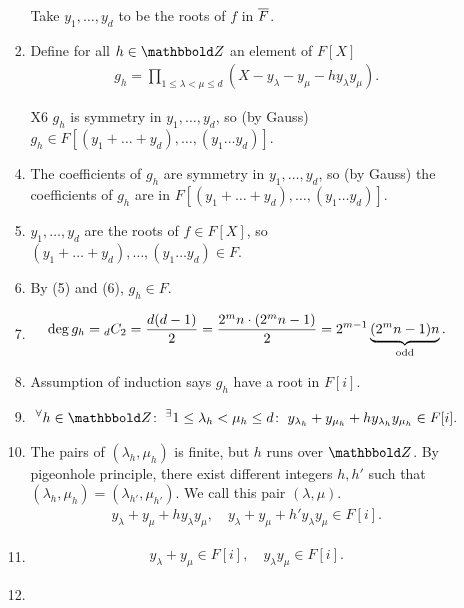 \documentclass[9pt]{ltjsarticle}
\begin{document}
\begin{itemize}
\begin{itemize}
\begin{enumerate}
      Take $y_1,\dots,y_d$ to be the roots of $f$ in $\overline{F}$.
      \item
      Define for all $h\in \Z$ an element of $F[X]$
      \begin{align}
        g_h = \prod_{1\le \lambda < \mu \le d} (X- y_\lambda - y_\mu -hy_\lambda y_\mu).
      \end{align}
      \item[X6]
      $g_h$ is symmetry in $y_1,\dots,y_d$, so (by Gauss)
      $g_h \in F[(y_1+\dots+y_d),\dots,(y_1\dots y_d)]$.
      \item
      The coefficients of $g_h$ are symmetry in $y_1,\dots,y_d$,
      so (by Gauss) the coefficients of $g_h$ are in $F[(y_1+\dots+y_d),\dots,(y_1\dots y_d)]$.

      \item
      $y_1,\dots,y_d$ are the roots of $f\in F[X]$, so
      $(y_1+\dots+y_d),\dots,(y_1\dots y_d) \in F$.
      \item
      By (5) and (6), $g_h \in F$.
      \item
      \begin{align}
        \deg g_h = {}_{d}C_{2}
        =
        \frac{d(d-1)}{2}
        =
        \frac{2^m n \cdot (2^m n -1)}{2}
        =
        2^{m-1} \underbrace{(2^m n -1)n}_{\text{odd}}.
      \end{align}
      \item
      Assumption of induction says $g_h $ have a root in $F[i]$.
      \item
      \begin{align}
        \Forall{h\in \Z} \Exists{1\le \lambda_h < \mu_h \le d} y_{\lambda_h}+y_{\mu_h} + hy_{\lambda_h}y_{\mu_h} \in F[i].
      \end{align}
      \item
      The pairs of $(\lambda_h ,\mu_h)$ is finite, but $h$ runs over $\Z$.
      By pigeonhole principle, there exist different integers $h,h'$ such that
      $(\lambda_h,\mu_h) = (\lambda_{h'},\mu_{h'})$.
      We call this pair $(\lambda,\mu)$.
      \begin{align}
        y_\lambda + y_\mu + hy_\lambda y_\mu,\quad
        y_\lambda + y_\mu + h'y_\lambda y_\mu \in F[i].
      \end{align}
      \item
      \begin{align}
        y_\lambda + y_\mu \in F[i] ,\quad
        y_\lambda y_\mu \in F[i].
      \end{align}
      \item

\end{enumerate}
\end{itemize}
\end{itemize}
\end{document}
